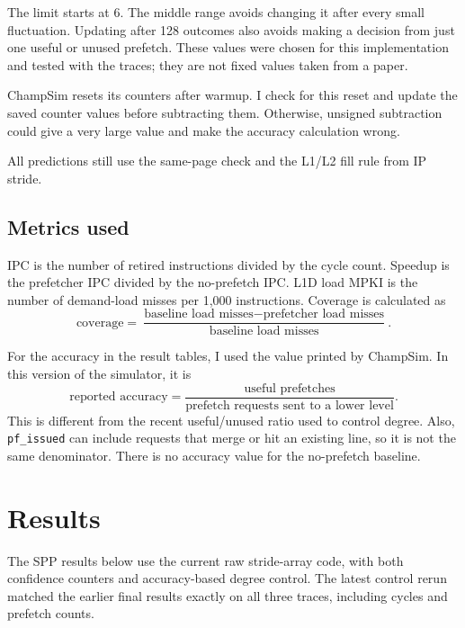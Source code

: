 \documentclass[11pt,a4paper]{article}
\begin{document}
The limit starts at 6. The middle range avoids changing it after every
small fluctuation. Updating after 128 outcomes also avoids making a
decision from just one useful or unused prefetch. These values were
chosen for this implementation and tested with the traces; they are
not fixed values taken from a paper.

ChampSim resets its counters after warmup. I check for this reset and
update the saved counter values before subtracting them. Otherwise,
unsigned subtraction could give a very large value and make the
accuracy calculation wrong.

All predictions still use the same-page check and the L1/L2 fill rule
from IP stride.

\subsection{Metrics used}

IPC is the number of retired instructions divided by the cycle count.
Speedup is the prefetcher IPC divided by the no-prefetch IPC.
L1D load MPKI is the number of demand-load misses per 1,000 instructions.
Coverage is calculated as
\[
\text{coverage} =
\frac{\text{baseline load misses} - \text{prefetcher load misses}}
{\text{baseline load misses}}.
\]

For the accuracy in the result tables, I used the value printed by
ChampSim. In this version of the simulator, it is
\[
\text{reported accuracy} =
\frac{\text{useful prefetches}}{\text{prefetch requests sent to a lower level}}.
\]
This is different from the recent useful/unused ratio used to control
degree. Also, \texttt{pf\_issued} can include requests that merge or
hit an existing line, so it is not the same denominator. There is no
accuracy value for the no-prefetch baseline.

\section{Results}

The SPP results below use the current raw stride-array code, with both
confidence counters and accuracy-based degree control. The latest
control rerun matched the earlier final results exactly on all three
traces, including cycles and prefetch counts.
\end{document}
